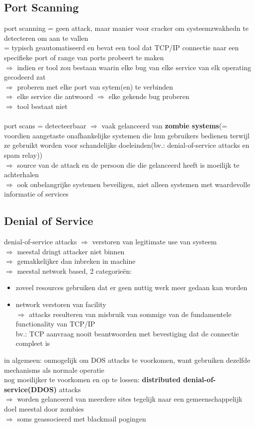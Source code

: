 \documentclass{report}
\begin{document}
\subsection{Port Scanning}
port scanning = geen attack, maar manier voor cracker om systeemzwakhedn te detecteren om aan te vallen
\\= typisch geautomatiseerd en bevat een tool dat TCP/IP connectie naar een specifieke port of range van ports probeert te maken 
\\$\Rightarrow$ indien er tool zou bestaan waarin elke bug van elke service van elk operating gecodeerd zat
\\$\Rightarrow$ proberen met elke port van sytem(en) te verbinden
\\$\Rightarrow$ elke service die antwoord $\Rightarrow$ elke gekende bug proberen
\\$\Rightarrow$ tool bestaat niet
\\
\\port scans = detecteerbaar $\Rightarrow$ vaak gelanceerd van \textbf{zombie systems}(= voordien aangetaste onafhankelijke systemen die hun gebruikers bedienen terwijl ze gebruikt worden voor schandelijke doeleinden(bv.: denial-of-service attacks en spam relay))
\\$\Rightarrow$ source van de attack en de persoon die die gelanceerd heeft is moeilijk te achterhalen
\\$\Rightarrow$ ook onbelangrijke systemen beveiligen, niet alleen systemen met waardevolle informatie of services

\subsection{Denial of Service}
denial-of-service attacks $\Rightarrow$ verstoren van legitimate use van systeem
\\$\Rightarrow$ meestal dringt attacker niet binnen
\\$\Rightarrow$ gemakkelijker dan inbreken in machine
\\$\Rightarrow$ meestal network based, 2 categorie\"en:
\begin{itemize}
\item zoveel resources gebruiken dat er geen nuttig werk meer gedaan kan worden
\item network verstoren van facility
\\$\Rightarrow$ attacks resulteren van misbruik van sommige van de fundamentele functionality van TCP/IP
\\bv.: TCP aanvraag nooit beantwoorden met bevestiging dat de connectie compleet is
\end{itemize}
in algemeen: onmogelijk om DOS attacks te voorkomen, want gebruiken dezelfde mechanisms als normale operatie
\\nog moeilijker te voorkomen en op te lossen: \textbf{distributed denial-of-service(DDOS)} attacks
\\$\Rightarrow$ worden gelanceerd van meerdere sites tegelijk naar een gemeenschappelijk doel meestal door zombies
\\$\Rightarrow$ soms geassocieerd met blackmail pogingen
\end{document}
